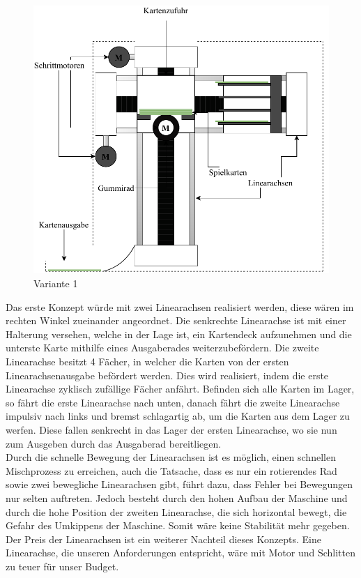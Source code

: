 \begin{figure}[hb]
    \centering
    \includegraphics[scale=0.9,page=1]{fig/mech/Version1}
    \caption{Variante 1}

\end{figure}


Das erste Konzept würde mit zwei Linearachsen realisiert werden, diese wären im rechten Winkel zueinander
angeordnet. Die senkrechte Linearachse ist mit einer Halterung versehen, welche in der Lage ist,
ein Kartendeck aufzunehmen und die unterste Karte mithilfe eines Ausgaberades weiterzubefördern. Die zweite
Linearachse besitzt 4 Fächer, in welcher die Karten von der ersten Linearachsenausgabe befördert werden.
Dies wird realisiert, indem die erste Linearachse zyklisch zufällige Fächer anfährt. Befinden sich alle Karten im Lager, so fährt die erste Linearachse nach unten, danach
fährt die zweite Linearachse impulsiv nach links und bremst schlagartig ab, um die Karten aus dem Lager zu werfen. Diese fallen
senkrecht in das Lager der ersten Linearachse, wo sie nun zum Ausgeben durch das Ausgaberad bereitliegen. \\



Durch die schnelle Bewegung der Linearachsen ist es möglich, einen schnellen Mischprozess zu erreichen,
auch die Tatsache, dass es nur ein rotierendes Rad sowie zwei bewegliche Linearachsen gibt, führt dazu, dass
Fehler bei Bewegungen nur selten auftreten. Jedoch besteht durch den hohen Aufbau der Maschine und durch die hohe
Position der zweiten Linearachse, die sich horizontal bewegt, die Gefahr des Umkippens der Maschine. Somit wäre
keine Stabilität mehr gegeben. Der Preis der Linearachsen ist ein weiterer Nachteil dieses Konzepts. Eine Linearachse,
die unseren Anforderungen entspricht, wäre mit Motor und Schlitten zu teuer für unser Budget. \\

